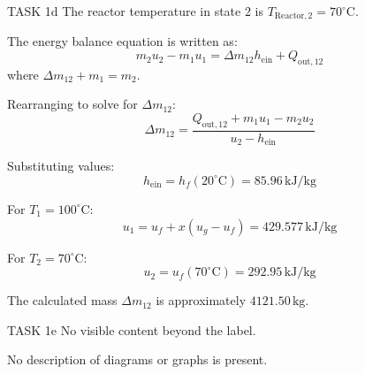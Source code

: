 TASK 1d  
The reactor temperature in state 2 is \( T_{\text{Reactor},2} = 70^\circ\text{C} \).  

The energy balance equation is written as:  
\[
m_2 u_2 - m_1 u_1 = \Delta m_{12} h_{\text{ein}} + Q_{\text{out},12}
\]  
where \( \Delta m_{12} + m_1 = m_2 \).  

Rearranging to solve for \( \Delta m_{12} \):  
\[
\Delta m_{12} = \frac{Q_{\text{out},12} + m_1 u_1 - m_2 u_2}{u_2 - h_{\text{ein}}}
\]  

Substituting values:  
\[
h_{\text{ein}} = h_f(20^\circ\text{C}) = 85.96 \, \text{kJ/kg}
\]  

For \( T_1 = 100^\circ\text{C} \):  
\[
u_1 = u_f + x (u_g - u_f) = 429.577 \, \text{kJ/kg}
\]  

For \( T_2 = 70^\circ\text{C} \):  
\[
u_2 = u_f(70^\circ\text{C}) = 292.95 \, \text{kJ/kg}
\]  

The calculated mass \( \Delta m_{12} \) is approximately \( 4121.50 \, \text{kg} \).  

TASK 1e  
No visible content beyond the label.  

No description of diagrams or graphs is present.